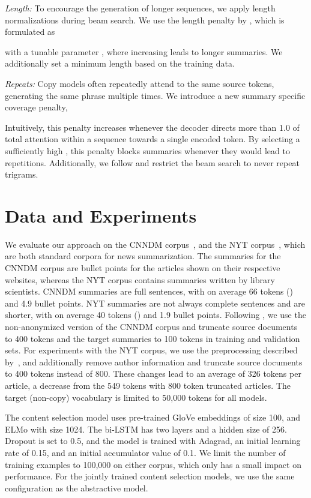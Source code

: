 \documentclass[11pt,a4paper]{article}
\begin{document}
\textit{Length:} To encourage the generation of longer sequences, we apply length normalizations during beam search. We use the length penalty by \citet{wu2016google}, which is formulated as



\noindent with a tunable parameter , where increasing  leads to longer summaries. We additionally set a minimum length based on the training data.

\textit{Repeats:} Copy models often repeatedly attend to the same source tokens, generating the same phrase multiple times. 
We introduce a new summary specific coverage penalty,


\noindent Intuitively, this penalty increases whenever the decoder directs more than 1.0 of total attention within a sequence towards a single encoded token. By selecting a sufficiently high , this penalty blocks summaries whenever they would lead to repetitions.
Additionally, we follow \citep{paulus2017deep} and restrict the beam search to never repeat trigrams.


\section{Data and Experiments}

We evaluate our approach on the \gls{CNNDM} corpus~\citep{hermann2015teaching,nallapati2016abstractive}, and the NYT corpus~\citep{sandhaus2008new}, which are both standard corpora for news summarization. The summaries for the \gls{CNNDM} corpus are bullet points for the articles shown on their respective websites, whereas the NYT corpus contains summaries written by library scientists. \gls{CNNDM} summaries are full sentences, with on average 66 tokens () and 4.9 bullet points. 
NYT summaries are not always complete sentences and are shorter, with on average 40 tokens () and 1.9 bullet points. 
Following \citet{see2017get}, we use the non-anonymized version of the \gls{CNNDM} corpus and truncate source documents to 400 tokens and the target summaries to 100 tokens in training and validation sets. 
For experiments with the NYT corpus, we use the preprocessing described by~\citet{paulus2017deep}, and additionally remove author information and truncate source documents to 400 tokens instead of 800. These changes lead to an average of 326 tokens per article, a decrease from the 549 tokens with 800 token truncated articles.
The target (non-copy) vocabulary is limited to 50,000 tokens for all models. 

The content selection model uses pre-trained GloVe embeddings of size 100, and ELMo with size 1024. The bi-LSTM has two layers and a hidden size of 256. Dropout is set to 0.5, and the model is trained with Adagrad, an initial learning rate of 0.15, and an initial accumulator value of 0.1. We limit the number of training examples to 100,000 on either corpus, which 
only has a small impact on performance. For the jointly trained content selection models, we use the same configuration as the abstractive model. 
\end{document}
